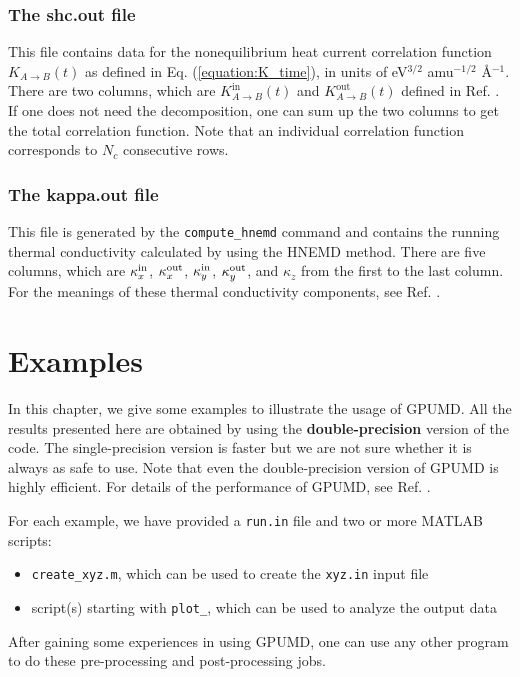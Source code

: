 \documentclass[12pt,a4paper]{report}
\begin{document}
\subsection{The shc.out file}

This file contains data for the nonequilibrium heat current correlation function $K_{A \rightarrow B}(t)$ as defined in Eq. (\ref{equation:K_time}), in units of eV$^{3/2}$ amu$^{-1/2}$ \AA$^{-1}$. There are two columns, which are $K_{A \rightarrow B}^{\text{in}}(t)$ and $K_{A \rightarrow B}^{\text{out}}(t)$ defined in Ref. \cite{fan2017prb}. If one does not need the decomposition, one can sum up the two columns to get the total correlation function. Note that an individual correlation function corresponds to $N_c$ consecutive rows.


\subsection{The kappa.out file}

This file is generated by the \verb"compute_hnemd" command and contains the running thermal conductivity calculated by using the HNEMD method. There are five columns, which are $\kappa^{\rm in}_x$, $\kappa^{\rm out}_x$, $\kappa^{\rm in}_y$, $\kappa^{\rm out}_y$, and $\kappa_z$ from the first to the last column. For the meanings of these thermal conductivity components, see Ref. \cite{fan2018submitted,xu2018msmse,dong2018pccp}.

\chapter{Examples\label{chapter:examples}}

In this chapter, we give some examples to illustrate the usage of GPUMD. All the results presented here are obtained by using the \textbf{double-precision} version of the code. The single-precision version is faster but we are not sure whether it is always as safe to use.
Note that even the double-precision version of GPUMD is highly efficient. For details of the performance of GPUMD, see Ref. \cite{fan2017cpc}.

For each example, we have provided a \verb"run.in" file and two or more MATLAB scripts:
\begin{itemize}
\item \verb"create_xyz.m", which can be used to create the \verb"xyz.in" input file
\item script(s) starting with \verb"plot_", which can be used to analyze the output data
\end{itemize}
After gaining some experiences in using GPUMD, one can use any other program to do these pre-processing and post-processing jobs.
\end{document}
